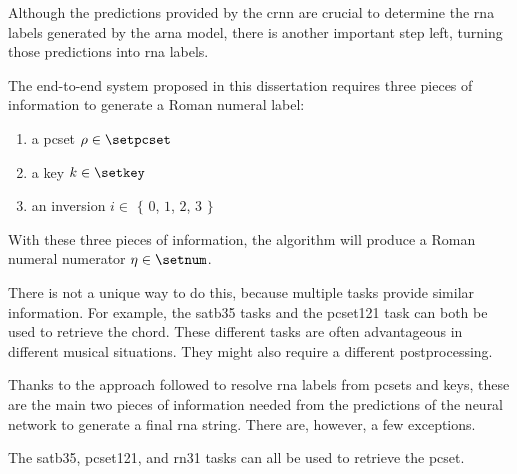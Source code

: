 
Although the predictions provided by the \gls{crnn} are
crucial to determine the \gls{rna} labels generated by the
\gls{arna} model, there is another important step left,
turning those predictions into \gls{rna} labels.

The end-to-end system proposed in this dissertation requires
three pieces of information to generate a Roman numeral
label:
\begin{enumerate}
    \item a \gls{pcset} $\rho \in \setpcset$
    \item a key $k \in \setkey$
    \item an inversion $i \in$ $\{$ $0$, $1$, $2$, $3$ $\}$
\end{enumerate}

With these three pieces of information, the \algorithmrn{}
algorithm will produce a Roman numeral numerator $\eta \in
\setnum$.

There is not a unique way to do this, because multiple tasks
provide similar information. For example, the \gls{satb35}
tasks and the \gls{pcset121} task can both be used to
retrieve the chord. These different tasks are often
advantageous in different musical situations. They might
also require a different postprocessing.

Thanks to the approach followed to resolve \gls{rna} labels
from \gls{pcset}s and keys, these are the main two pieces of
information needed from the predictions of the neural
network to generate a final \gls{rna} string. There are,
however, a few exceptions.

The \gls{satb35}, \gls{pcset121}, and \gls{rn31} tasks can
all be used to retrieve the \gls{pcset}.




